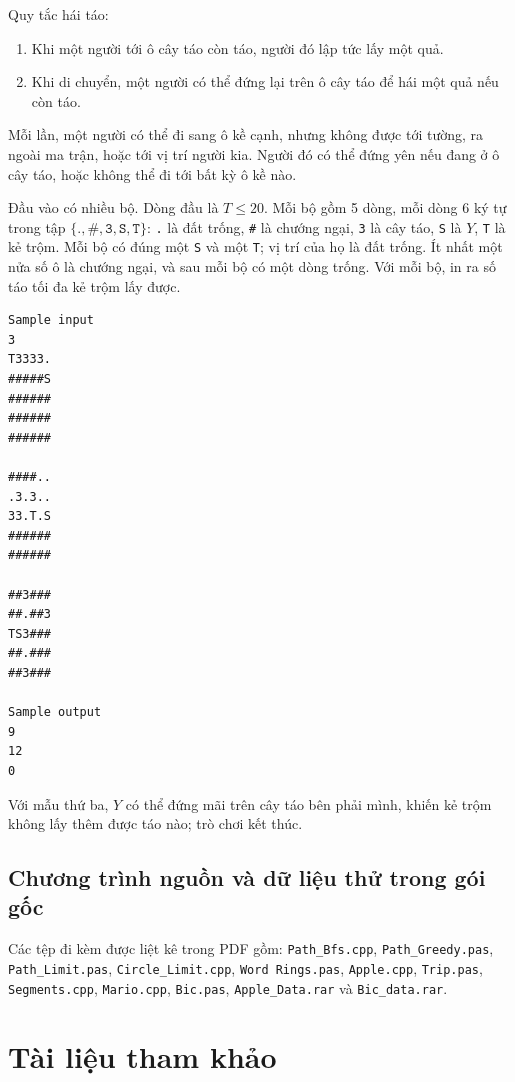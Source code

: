\documentclass[11pt]{article}
\begin{document}
Quy tắc hái táo:
\begin{enumerate}
  \item Khi một người tới ô cây táo còn táo, người đó lập tức lấy một quả.
  \item Khi di chuyển, một người có thể đứng lại trên ô cây táo để hái một
  quả nếu còn táo.
\end{enumerate}
Mỗi lần, một người có thể đi sang ô kề cạnh, nhưng không được tới tường, ra
ngoài ma trận, hoặc tới vị trí người kia. Người đó có thể đứng yên nếu đang ở
ô cây táo, hoặc không thể đi tới bất kỳ ô kề nào.

Đầu vào có nhiều bộ. Dòng đầu là \(T\le 20\). Mỗi bộ gồm 5 dòng, mỗi dòng 6
ký tự trong tập \(\{\texttt{.},\texttt{\#},\texttt{3},\texttt{S},\texttt{T}\}\):
\texttt{.} là đất trống, \texttt{\#} là chướng ngại, \texttt{3} là cây táo,
\texttt{S} là \(Y\), \texttt{T} là kẻ trộm. Mỗi bộ có đúng một \texttt{S} và
một \texttt{T}; vị trí của họ là đất trống. Ít nhất một nửa số ô là chướng
ngại, và sau mỗi bộ có một dòng trống. Với mỗi bộ, in ra số táo tối đa kẻ
trộm lấy được.

\begin{verbatim}
Sample input
3
T3333.
#####S
######
######
######

####..
.3.3..
33.T.S
######
######

##3###
##.##3
TS3###
##.###
##3###

Sample output
9
12
0
\end{verbatim}

Với mẫu thứ ba, \(Y\) có thể đứng mãi trên cây táo bên phải mình, khiến kẻ
trộm không lấy thêm được táo nào; trò chơi kết thúc.

\subsection{Chương trình nguồn và dữ liệu thử trong gói gốc}

Các tệp đi kèm được liệt kê trong PDF gồm:
\texttt{Path\_Bfs.cpp}, \texttt{Path\_Greedy.pas}, \texttt{Path\_Limit.pas},
\texttt{Circle\_Limit.cpp}, \texttt{Word Rings.pas}, \texttt{Apple.cpp},
\texttt{Trip.pas}, \texttt{Segments.cpp}, \texttt{Mario.cpp}, \texttt{Bic.pas},
\texttt{Apple\_Data.rar} và \texttt{Bic\_data.rar}.

\section{Tài liệu tham khảo}
\end{document}
